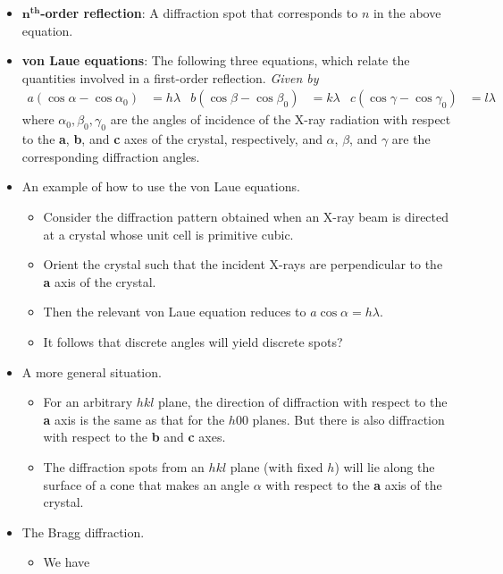 \documentclass[../notes.tex]{subfiles}
\begin{document}
\begin{itemize}
    \item \textbf{$\bm{n}^\textbf{th}$-order reflection}: A diffraction spot that corresponds to $n$ in the above equation.
    \item \textbf{von Laue equations}: The following three equations, which relate the quantities involved in a first-order reflection. \emph{Given by}
    \begin{align*}
        a(\cos\alpha-\cos\alpha_0) &= h\lambda&
        b(\cos\beta-\cos\beta_0) &= k\lambda&
        c(\cos\gamma-\cos\gamma_0) &= l\lambda
    \end{align*}
    where $\alpha_0,\beta_0,\gamma_0$ are the angles of incidence of the X-ray radiation with respect to the \textbf{a}, \textbf{b}, and \textbf{c} axes of the crystal, respectively, and $\alpha$, $\beta$, and $\gamma$ are the corresponding diffraction angles.
    \item An example of how to use the von Laue equations.
    \begin{itemize}
        \item Consider the diffraction pattern obtained when an X-ray beam is directed at a crystal whose unit cell is primitive cubic.
        \item Orient the crystal such that the incident X-rays are perpendicular to the \textbf{a} axis of the crystal.
        \item Then the relevant von Laue equation reduces to $a\cos\alpha=h\lambda$.
        \item It follows that discrete angles will yield discrete spots?
    \end{itemize}
    \item A more general situation.
    \begin{itemize}
        \item For an arbitrary $hkl$ plane, the direction of diffraction with respect to the \textbf{a} axis is the same as that for the $h00$ planes. But there is also diffraction with respect to the \textbf{b} and \textbf{c} axes.
        \item The diffraction spots from an $hkl$ plane (with fixed $h$) will lie along the surface of a cone that makes an angle $\alpha$ with respect to the \textbf{a} axis of the crystal.
    \end{itemize}
    \item The Bragg diffraction.
    \begin{itemize}
        \item We have
        \begin{equation*}

\end{equation*}
\end{itemize}
\end{itemize}
\end{document}
